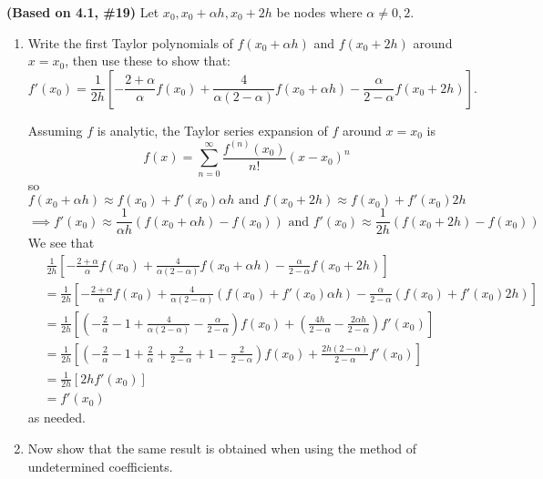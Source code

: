 \documentclass{eh-homework}
\begin{document}
\begin{question}{5}
\textbf{(Based on 4.1, \#19)} Let \( x_0, x_0 + \alpha h, x_0 + 2h \) be nodes where \( \alpha \neq 0,2 \).

\begin{enumerate}[label=\alph*.]
    \item Write the first Taylor polynomials of \( f(x_0 +\alpha h) \) and \( f(x_0 +2h) \) around \( x = x_0 \), then use these to show that:
    \[
    f'(x_0) = \frac{1}{2h} \left[ -\frac{2+\alpha}{\alpha} f(x_0) + \frac{4}{\alpha(2-\alpha)} f(x_0 + \alpha h) - \frac{\alpha}{2-\alpha} f(x_0 + 2h) \right].
    \]

    Assuming \(f\) is analytic, the Taylor series expansion of \(f\) around \(x = x_0\) is
    \[
        f(x) = \sum_{n=0}^{\infty} \frac{f^{(n)}(x_0)}{n!}(x - x_0)^n
    \]
    so
    \[
        f(x_0 + \alpha h) \approx f(x_0) + f'(x_0) \alpha h \text{ and } f(x_0 + 2h) \approx f(x_0) + f'(x_0) 2h
    \]
    \[
        \implies f'(x_0) \approx \frac{1}{\alpha h}(f(x_0 + \alpha h) - f(x_0)) \text{ and } f'(x_0) \approx \frac{1}{2h}(f(x_0 + 2h) - f(x_0))
    \]
    We see that
    \begin{align*}
        &\ \frac{1}{2h} \left[ -\frac{2+\alpha}{\alpha} f(x_0) + \frac{4}{\alpha(2-\alpha)} f(x_0 + \alpha h) - \frac{\alpha}{2-\alpha} f(x_0 + 2h) \right] \\
        &= \frac{1}{2h} \left[ -\frac{2+\alpha}{\alpha} f(x_0) + \frac{4}{\alpha(2-\alpha)} (f(x_0) + f'(x_0) \alpha h) - \frac{\alpha}{2-\alpha} (f(x_0) + f'(x_0) 2h) \right] \\
        &= \frac{1}{2h}\left[ \left( -\frac{2}{\alpha} - 1 + \frac{4}{\alpha (2 - \alpha)} - \frac{\alpha}{2 - \alpha} \right) f(x_0) + \left( \frac{4h}{2 - \alpha} - \frac{2\alpha h}{2 - \alpha} \right) f'(x_0) \right] \\
        &= \frac{1}{2h}\left[ \left( -\frac{2}{\alpha} - 1 + \frac{2}{\alpha} + \frac{2}{2 - \alpha} + 1 - \frac{2}{2 - \alpha} \right) f(x_0) + \frac{2h(2 - \alpha)}{2 - \alpha} f'(x_0) \right] \\
        &= \frac{1}{2h}[2h f'(x_0)] \\
        &= f'(x_0)
    \end{align*}
    as needed.

    \item Now show that the same result is obtained when using the method of undetermined coefficients.
    

\end{enumerate}
\end{question}
\end{document}
